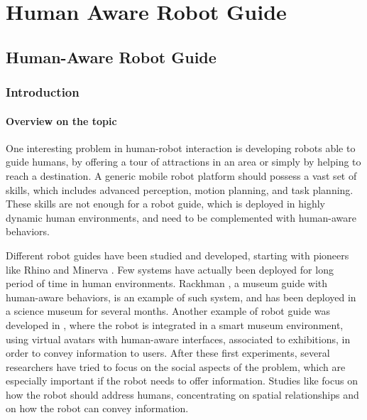 \chapter{Human Aware Robot Guide} %

\label{chapter:spencer} %




\section{Human-Aware Robot Guide}
\label{sec:case_study-spencer}
\subsection{Introduction}
\label{subsec:case_study-spencer-intro}
\subsubsection{Overview on the topic}
One interesting problem in human-robot interaction is developing robots able to guide humans, by offering a tour of attractions in an area or simply by helping to reach a destination.
A generic mobile robot platform should possess a vast set of skills, which includes advanced perception, motion planning, and task planning. These skills are not enough for a robot guide, which is deployed in highly dynamic human environments, and need to be complemented with human-aware behaviors.

Different robot guides have been studied and developed, starting with pioneers like Rhino and Minerva \cite{thrun2000probabilistic}.  Few systems have actually been deployed for long period of time in human environments. Rackhman \cite{clodic2006rackham}, a museum guide with human-aware behaviors, is an example of such system, and has been deployed in a science museum for several months. Another example of robot guide was developed in \cite{bueno2011autonomous}, where the robot is integrated  in a smart museum environment, using virtual avatars with human-aware interfaces, associated to exhibitions, in order to convey information to users. After these first experiments, several researchers have tried to focus on the social aspects of the problem, which are especially important if the robot needs to offer information. Studies like \cite{yousuf2012development,evers2014development} focus on how the robot should address humans, concentrating on spatial relationships and on how the robot can convey information.

